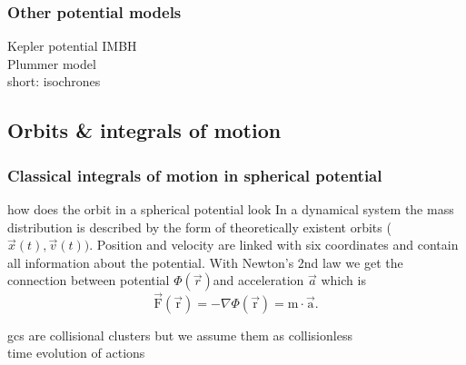 \subsubsection{Other potential models}\label{sec:other_pot}
Kepler potential IMBH\\Plummer model\\short: isochrones
\subsection{Orbits \& integrals of motion}\label{orbit_int_of_motion_theory}
\subsubsection{Classical integrals of motion in spherical potential}
\color{red} how does the orbit in a spherical potential look \color{black}
In a dynamical system the mass distribution is described by the form of theoretically existent orbits (\(\vec{x}(t),\vec{v}(t))\). Position and velocity are linked with six coordinates and contain all information about the potential. With Newton's 2nd law we get the connection between potential \(\Phi(\vec{r})\)and acceleration \(\vec{a}\) which is \[\vec{\mathrm{F}}(\vec{\mathrm{r}})=-\nabla\Phi(\vec{\mathrm{r}})=\mathrm{m}\cdot\vec{\mathrm{a}}.\]  

\color{red} gcs are collisional clusters but we assume them as collisionless \\ time evolution of actions \color{black}
